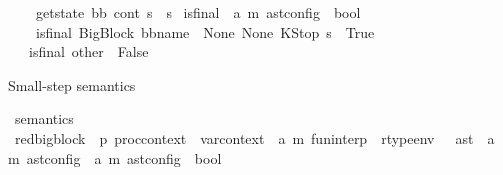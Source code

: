 \begin{isabellebody}
\ \ \ \ {\isachardoublequoteopen}get{\isacharunderscore}{\kern0pt}state\ {\isacharparenleft}{\kern0pt}bb{\isacharcomma}{\kern0pt}\ cont{\isacharcomma}{\kern0pt}\ s{}{\isacharparenright}{\kern0pt}\ {\isacharequal}{\kern0pt}\ s{}{\isachardoublequoteclose}\isanewline
\isanewline
{}\isamarkupfalse%
\ is{\isacharunderscore}{\kern0pt}final\ {\isacharcolon}{\kern0pt}{\isacharcolon}{\kern0pt}\ {\isachardoublequoteopen}{\isacharparenleft}{\kern0pt}{\isacharprime}{\kern0pt}a{\isacharcomma}{\kern0pt}\ {\isacharprime}{\kern0pt}m{\isacharparenright}{\kern0pt}\ ast{\isacharunderscore}{\kern0pt}config\ {\isasymRightarrow}\ bool{\isachardoublequoteclose}\ \isanewline
\ \ \isanewline
\ \ \ \ {\isachardoublequoteopen}is{\isacharunderscore}{\kern0pt}final\ {\isacharparenleft}{\kern0pt}{\isacharparenleft}{\kern0pt}BigBlock\ bb{\isacharunderscore}{\kern0pt}name\ {\isacharbrackleft}{\kern0pt}{\isacharbrackright}{\kern0pt}\ None\ None{\isacharparenright}{\kern0pt}{\isacharcomma}{\kern0pt}\ KStop{\isacharcomma}{\kern0pt}\ s{}{\isacharparenright}{\kern0pt}\ {\isacharequal}{\kern0pt}\ True{\isachardoublequoteclose}\isanewline
\ \ {\isacharbar}{\kern0pt}\ {\isachardoublequoteopen}is{\isacharunderscore}{\kern0pt}final\ other\ {\isacharequal}{\kern0pt}\ False{\isachardoublequoteclose}%
\begin{isamarkuptext}%
Small-step semantics%
\end{isamarkuptext}\isamarkuptrue%
\isamarkupfalse%
\ semantics\ \isanewline
\isanewline
{}\isamarkupfalse%
\ red{\isacharunderscore}{\kern0pt}bigblock\ {\isacharcolon}{\kern0pt}{\isacharcolon}{\kern0pt}\ {\isachardoublequoteopen}{\isacharprime}{\kern0pt}p\ proc{\isacharunderscore}{\kern0pt}context\ {\isasymRightarrow}\ var{\isacharunderscore}{\kern0pt}context\ {\isasymRightarrow}\ {\isacharparenleft}{\kern0pt}{\isacharprime}{\kern0pt}a{\isacharcomma}{\kern0pt}\ {\isacharprime}{\kern0pt}m{\isacharparenright}{\kern0pt}\ fun{\isacharunderscore}{\kern0pt}interp\ {\isasymRightarrow}\ rtype{\isacharunderscore}{\kern0pt}env\ \ {\isasymRightarrow}\ ast\ {\isasymRightarrow}\ {\isacharparenleft}{\kern0pt}{\isacharprime}{\kern0pt}a{\isacharcomma}{\kern0pt}\ {\isacharprime}{\kern0pt}m{\isacharparenright}{\kern0pt}\ ast{\isacharunderscore}{\kern0pt}config\ {\isasymRightarrow}\ {\isacharparenleft}{\kern0pt}{\isacharprime}{\kern0pt}a{\isacharcomma}{\kern0pt}\ {\isacharprime}{\kern0pt}m{\isacharparenright}{\kern0pt}\ ast{\isacharunderscore}{\kern0pt}config\ {\isasymRightarrow}\ bool{\isachardoublequoteclose}\ \isanewline

\end{isabellebody}

